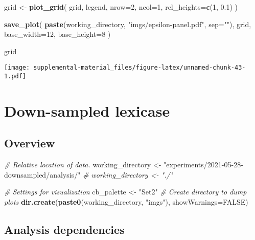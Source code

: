 \documentclass[]{book}
\newenvironment{Shaded}{\begin{snugshade}}{\end{snugshade}}
\newcommand{\CommentTok}[1]{\textcolor[rgb]{0.56,0.35,0.01}{\textit{#1}}}
\newcommand{\DataTypeTok}[1]{\textcolor[rgb]{0.13,0.29,0.53}{#1}}
\newcommand{\DecValTok}[1]{\textcolor[rgb]{0.00,0.00,0.81}{#1}}
\newcommand{\FloatTok}[1]{\textcolor[rgb]{0.00,0.00,0.81}{#1}}
\newcommand{\KeywordTok}[1]{\textcolor[rgb]{0.13,0.29,0.53}{\textbf{#1}}}
\newcommand{\NormalTok}[1]{#1}
\newcommand{\OtherTok}[1]{\textcolor[rgb]{0.56,0.35,0.01}{#1}}
\newcommand{\StringTok}[1]{\textcolor[rgb]{0.31,0.60,0.02}{#1}}
\begin{document}
\begin{Shaded}
\begin{Highlighting}[]
\NormalTok{grid <-}\StringTok{ }\KeywordTok{plot_grid}\NormalTok{(}
\NormalTok{  grid,}
\NormalTok{  legend,}
  \DataTypeTok{nrow=}\DecValTok{2}\NormalTok{,}
  \DataTypeTok{ncol=}\DecValTok{1}\NormalTok{,}
  \DataTypeTok{rel_heights=}\KeywordTok{c}\NormalTok{(}\DecValTok{1}\NormalTok{, }\FloatTok{0.1}\NormalTok{)}
\NormalTok{)}

\KeywordTok{save_plot}\NormalTok{(}
  \KeywordTok{paste}\NormalTok{(working_directory, }\StringTok{"imgs/epsilon-panel.pdf"}\NormalTok{, }\DataTypeTok{sep=}\StringTok{""}\NormalTok{),}
\NormalTok{  grid,}
  \DataTypeTok{base_width=}\DecValTok{12}\NormalTok{,}
  \DataTypeTok{base_height=}\DecValTok{8}
\NormalTok{)}

\NormalTok{grid}
\end{Highlighting}
\end{Shaded}

\texttt{[image: supplemental-material\_files/figure-latex/unnamed-chunk-43-1.pdf]}

\hypertarget{down-sampled-lexicase}{%
\chapter{Down-sampled lexicase}\label{down-sampled-lexicase}}

\hypertarget{overview-4}{%
\section{Overview}\label{overview-4}}

\begin{Shaded}
\begin{Highlighting}[]
\CommentTok{# Relative location of data.}
\NormalTok{working_directory <-}\StringTok{ "experiments/2021-05-28-downsampled/analysis/"}
\CommentTok{# working_directory <- "./"}

\CommentTok{# Settings for visualization}
\NormalTok{cb_palette <-}\StringTok{ "Set2"}
\CommentTok{# Create directory to dump plots}
\KeywordTok{dir.create}\NormalTok{(}\KeywordTok{paste0}\NormalTok{(working_directory, }\StringTok{"imgs"}\NormalTok{), }\DataTypeTok{showWarnings=}\OtherTok{FALSE}\NormalTok{)}
\end{Highlighting}
\end{Shaded}

\hypertarget{analysis-dependencies-4}{%
\section{Analysis dependencies}\label{analysis-dependencies-4}}
\end{document}
